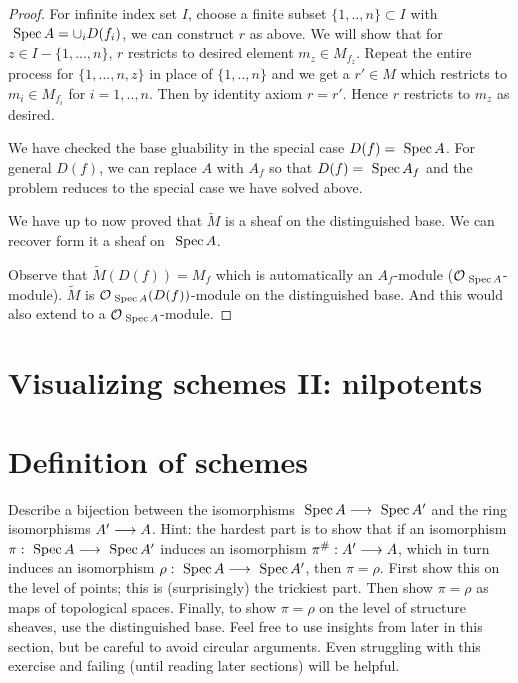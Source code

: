 \begin{proof}
For infinite index set $I$, choose a finite subset $\{1,..,n\}\subset I$ with $\text{ Spec\,} A=\cup_i D(f_i)$, we can construct $r$ as above. We will show that for $z\in I-\{1,...,n\}$, $r$ restricts to desired element $m_z\in M_{f_z}$. Repeat the entire process for $\{1,...,n,z\}$ in place of $\{1,..,n\}$ and we get a $r'\in M$ which restricts to $m_i\in M_{f_i}$ for $i=1,..,n$. Then by identity axiom $r=r'$. Hence $r$ restricts to $m_z$ as desired.

We have checked the base gluability in the special case $D(f)=\text{ Spec\,} A$. For general $D(f)$, we can replace $A$ with $A_f$ so that $D(f)=\text{ Spec\,} A_f$ and the problem reduces to the special case we have solved above.

We have up to now proved that $\tilde{M}$ is a sheaf on the distinguished base. We can recover form it a sheaf on $\text{ Spec\,} A$.

Observe that $\tilde{M}(D(f))=M_f$ which is automatically an $A_f$-module (${\cal O}_{\text{ Spec\,} A}$-module). $\tilde{M}$ is ${\cal O}_{\text{ Spec\,} A}(D(f))$-module on the distinguished base. And this would also extend to a ${\cal O}_{\text{ Spec\,} A}$-module.
\end{proof}





\section{Visualizing schemes II: nilpotents}
\section{Definition of schemes
}

\begin{exr}
Describe a bijection between the isomorphisms $\text{ Spec\,} A \longrightarrow \text{ Spec\,} A'$ and the ring isomorphisms $A' \longrightarrow A$. Hint: the hardest part is to show that if an isomorphism $\pi: \text{ Spec\,} A\longrightarrow \text{ Spec\,} A'$ induces an isomorphism $\pi^\#:A' \longrightarrow A$, which in turn induces an isomorphism $\rho: \text{ Spec\,} A \longrightarrow  \text{ Spec\,} A'$, then $\pi = \rho$. First show this on the level of points; this is (surprisingly) the trickiest part. Then show $\pi = \rho$ as maps of topological spaces. Finally, to show $\pi = \rho$ on the level of structure sheaves, use the distinguished base. Feel free to use insights from later in this section, but be careful to avoid circular arguments. Even struggling with this exercise and failing (until reading later sections) will be helpful.
\end{exr}

